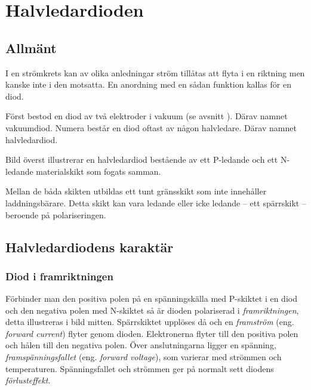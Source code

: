 \newpage
\section{Halvledardioden}

\subsection{Allmänt}
\label{dioden_allmaent}

I en strömkrets kan av olika anledningar ström tillåtas att flyta i en riktning
men kanske inte i den motsatta. En anordning med en sådan funktion kallas för
en diod.

Först bestod en diod av två elektroder i vakuum (se avsnitt
). Därav namnet vakuumdiod.
Numera består en diod oftast av någon halvledare. Därav namnet halvledardiod.


Bild  överst illustrerar en halvledardiod bestående av ett
P-ledande och ett N-ledande materialskikt som fogats samman.

Mellan de båda skikten utbildas ett tunt gränsskikt som inte innehåller
laddningsbärare. Detta skikt kan vara ledande eller icke ledande -- ett
spärrskikt -- beroende på polariseringen.

\subsection{Halvledardiodens karaktär}

\subsubsection{Diod i framriktningen}

Förbinder man den positiva polen på en spänningskälla med P-skiktet i en diod
och den negativa polen med N-skiktet så är dioden polariserad i
\emph{framriktningen}, detta illustreras i bild  mitten.
Spärrskiktet upplöses då och en \emph{framström}
(eng. \emph{forward current}) flyter genom dioden.
Elektronerna flyter till den positiva polen och hålen till den negativa polen.
Över anslutningarna ligger en spänning, \emph{framspänningsfallet}
(eng. \emph{forward voltage}), som varierar med strömmen och temperaturen.
Spänningsfallet och strömmen ger på normalt sett diodens \emph{förlusteffekt}.

